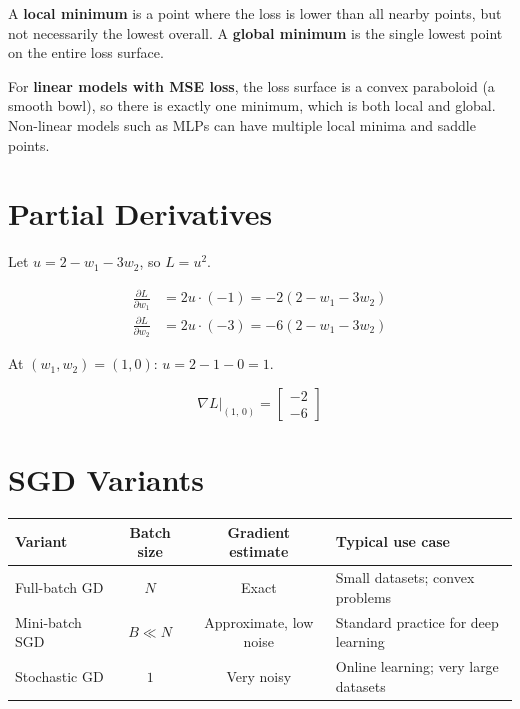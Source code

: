 \documentclass[11pt, a4paper]{article}
\begin{document}
\begin{tcolorbox}[solutionbox]
A \textbf{local minimum} is a point where the loss is lower than all nearby points,
but not necessarily the lowest overall. A \textbf{global minimum} is the single
lowest point on the entire loss surface.

For \textbf{linear models with MSE loss}, the loss surface is a convex paraboloid
(a smooth bowl), so there is exactly one minimum, which is both local and global.
Non-linear models such as MLPs can have multiple local minima and saddle points.
\end{tcolorbox}

\section{Partial Derivatives}

\begin{tcolorbox}[solutionbox]
Let $u = 2 - w_1 - 3w_2$, so $L = u^2$.

\begin{align*}
\frac{\partial L}{\partial w_1} &= 2u \cdot (-1) = -2(2 - w_1 - 3w_2) \\[0.4em]
\frac{\partial L}{\partial w_2} &= 2u \cdot (-3) = -6(2 - w_1 - 3w_2)
\end{align*}

At $(w_1, w_2) = (1, 0)$: $u = 2 - 1 - 0 = 1$.

\begin{tcolorbox}[answerbox]
$$\nabla L\big|_{(1,\,0)} = \begin{bmatrix} -2 \\ -6 \end{bmatrix}$$
\end{tcolorbox}
\end{tcolorbox}

\section{SGD Variants}

\begin{tcolorbox}[solutionbox]
\begin{center}
\begin{tabularx}{\linewidth}{lccX}
\toprule
Variant & Batch size & Gradient estimate & Typical use case \\
\midrule
Full-batch GD  & $N$       & Exact  & Small datasets; convex problems \\[0.5em]
Mini-batch SGD & $B \ll N$ & Approximate, low noise & Standard practice for deep learning \\[0.5em]
Stochastic GD  & $1$       & Very noisy & Online learning; very large datasets \\[0.5em]
\bottomrule
\end{tabularx}
\end{center}
\end{tcolorbox}
\end{document}
